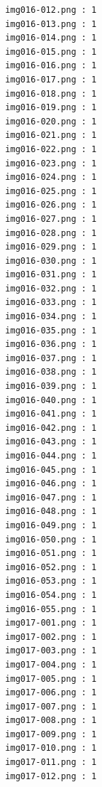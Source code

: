 \documentclass[12pt,a4paper]{article}
\begin{document}
\begin{lstlisting}
                     img016-012.png : 1
                     img016-013.png : 1
                     img016-014.png : 1
                     img016-015.png : 1
                     img016-016.png : 1
                     img016-017.png : 1
                     img016-018.png : 1
                     img016-019.png : 1
                     img016-020.png : 1
                     img016-021.png : 1
                     img016-022.png : 1
                     img016-023.png : 1
                     img016-024.png : 1
                     img016-025.png : 1
                     img016-026.png : 1
                     img016-027.png : 1
                     img016-028.png : 1
                     img016-029.png : 1
                     img016-030.png : 1
                     img016-031.png : 1
                     img016-032.png : 1
                     img016-033.png : 1
                     img016-034.png : 1
                     img016-035.png : 1
                     img016-036.png : 1
                     img016-037.png : 1
                     img016-038.png : 1
                     img016-039.png : 1
                     img016-040.png : 1
                     img016-041.png : 1
                     img016-042.png : 1
                     img016-043.png : 1
                     img016-044.png : 1
                     img016-045.png : 1
                     img016-046.png : 1
                     img016-047.png : 1
                     img016-048.png : 1
                     img016-049.png : 1
                     img016-050.png : 1
                     img016-051.png : 1
                     img016-052.png : 1
                     img016-053.png : 1
                     img016-054.png : 1
                     img016-055.png : 1
                     img017-001.png : 1
                     img017-002.png : 1
                     img017-003.png : 1
                     img017-004.png : 1
                     img017-005.png : 1
                     img017-006.png : 1
                     img017-007.png : 1
                     img017-008.png : 1
                     img017-009.png : 1
                     img017-010.png : 1
                     img017-011.png : 1
                     img017-012.png : 1




\end{lstlisting}
\end{document}

